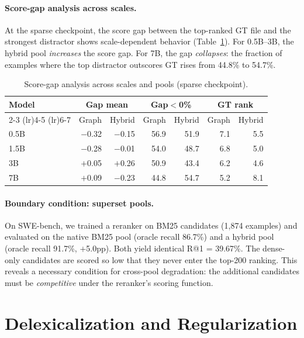 \documentclass{article}
\begin{document}
\paragraph{Score-gap analysis across scales.}
At the sparse checkpoint, the score gap between the top-ranked GT file and the strongest distractor shows scale-dependent behavior (Table~\ref{tab:score_gap}).
For 0.5B--3B, the hybrid pool \emph{increases} the score gap.
For 7B, the gap \emph{collapses}: the fraction of examples where the top distractor outscores GT rises from 44.8\% to 54.7\%.

\begin{table}[h]
\centering
\caption{Score-gap analysis across scales and pools (sparse checkpoint).}
\label{tab:score_gap}
\small
\begin{tabular}{lrrrrrr}
\toprule
\textbf{Model} & \multicolumn{2}{c}{\textbf{Gap mean}} & \multicolumn{2}{c}{\textbf{Gap$<$0\%}} & \multicolumn{2}{c}{\textbf{GT rank}} \\
\cmidrule(lr){2-3} \cmidrule(lr){4-5} \cmidrule(lr){6-7}
 & Graph & Hybrid & Graph & Hybrid & Graph & Hybrid \\
\midrule
0.5B  & $-$0.32 & $-$0.15 & 56.9 & 51.9 & 7.1 & 5.5 \\
1.5B  & $-$0.28 & $-$0.01 & 54.0 & 48.7 & 6.8 & 5.0 \\
3B    & $+$0.05 & $+$0.26 & 50.9 & 43.4 & 6.2 & 4.6 \\
7B    & $+$0.09 & $-$0.23 & 44.8 & 54.7 & 5.2 & 8.1 \\
\bottomrule
\end{tabular}
\end{table}

\paragraph{Boundary condition: superset pools.}
On SWE-bench, we trained a reranker on BM25 candidates (1,874 examples) and evaluated on the native BM25 pool (oracle recall 86.7\%) and a hybrid pool (oracle recall 91.7\%, $+$5.0pp).
Both yield identical R@1 = 39.67\%.
The dense-only candidates are scored so low that they never enter the top-200 ranking.
This reveals a necessary condition for cross-pool degradation: the additional candidates must be \emph{competitive} under the reranker's scoring function.


\section{Delexicalization and Regularization}
\label{app:delex}
\end{document}
